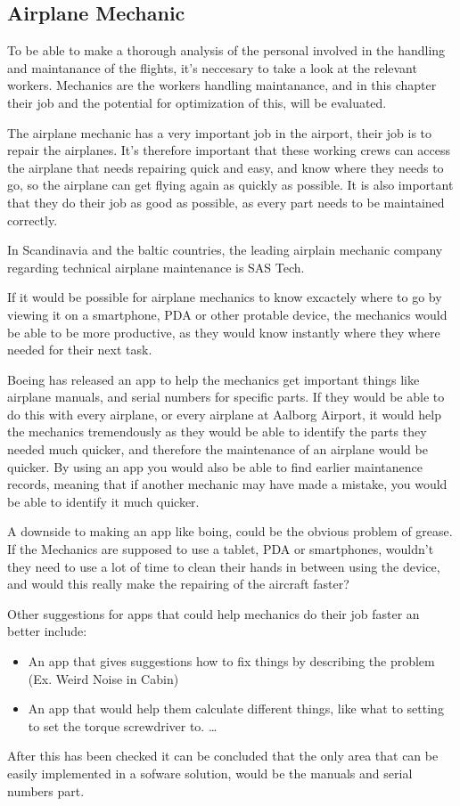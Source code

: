 \subsection{Airplane Mechanic}
To be able to make a thorough analysis of the personal involved in the handling and maintanance of the flights, it's neccesary to take a look at the relevant workers. Mechanics are the workers handling maintanance, and in this chapter their job and the potential for optimization of this, will be evaluated.

The airplane mechanic has a very important job in the airport, their job is to repair the airplanes. It's therefore important that these working crews can access the airplane that needs repairing quick and easy, and know where they needs to go, so the airplane can get flying again as quickly as possible. It is also important that they do their job as good as possible, as every part needs to be maintained correctly.

In Scandinavia and the baltic countries, the leading airplain mechanic company regarding technical airplane maintenance is SAS Tech.\cite{sas_tech_mechanic}

If it would be possible for airplane mechanics to know excactely where to go by viewing it on a smartphone, PDA or other protable device, the mechanics would be able to be more productive, as they would know instantly where they where needed for their next task. 

Boeing has released an app to help the mechanics get important things like airplane manuals, and serial numbers for specific parts. If they would be able to do this with every airplane, or every airplane at Aalborg Airport, it would help the mechanics tremendously as they would be able to identify the parts they needed much quicker, and therefore the maintenance of an airplane would be quicker. By using an app you would also be able to find earlier maintanence records, meaning that if another mechanic may have made a mistake, you would be able to identify it much quicker.\cite{cnet_boeing_app}

A downside to making an app like boing, could be the obvious problem of grease. If the Mechanics are supposed to use a tablet, PDA or smartphones, wouldn't they need to use a lot of time to clean their hands in between using the device, and would this really make the repairing of the aircraft faster?

Other suggestions for apps that could help mechanics do their job faster an better include:
\begin{itemize}
\item An app that gives suggestions how to fix things by describing the problem (Ex. Weird Noise in Cabin)
\item An app that would help them calculate different things, like what to setting to set the torque screwdriver to. \ldots
\end{itemize}

After this has been checked it can be concluded that the only area that can be easily implemented in a sofware solution, would be the manuals and serial numbers part.
